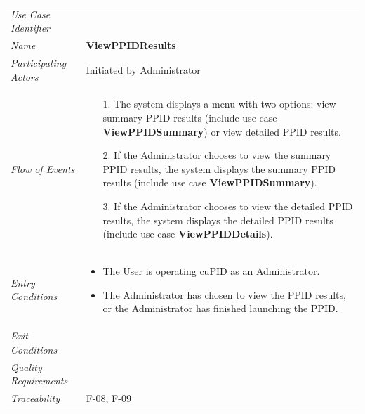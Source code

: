 \documentclass[12pt,letterpaper]{article}
\begin{document}
\begin{center}
	\begin{tabu} to 
		\toprule
		Use Case Identifier & \viewppidresults{} \\
		Name & {\bf ViewPPIDResults} \\
		Participating Actors & Initiated by Administrator \\
		Flow of Events & 
		\begin{minipage}[t]{\linewidth}
		    \begin{enumerate}
		        \item[1.] The system displays a menu with two options: view summary PPID results (include use case \textbf{ViewPPIDSummary}) or view detailed PPID results.
		        \item[2.] If the Administrator chooses to view the summary PPID results, the system displays the summary PPID results (include use case \textbf{ViewPPIDSummary}).
		        \item[3.] If the Administrator chooses to view the detailed PPID results, the system displays the detailed PPID results (include use case \textbf{ViewPPIDDetails}).
			\end{enumerate}
	    \end{minipage} \\

		Entry Conditions &
		\begin{minipage}[t]{\linewidth}
			\begin{itemize}
			    \item The User is operating cuPID as an Administrator.
			    \item The Administrator has chosen to view the PPID results, or the Administrator has finished launching the PPID.
	        \end{itemize}
	    \end{minipage} \\

		Exit Conditions & \\

		Quality Requirements & \\

		Traceability & F-08, F-09 \\
		\toprule
	\end{tabu}
\end{center}
\end{document}
